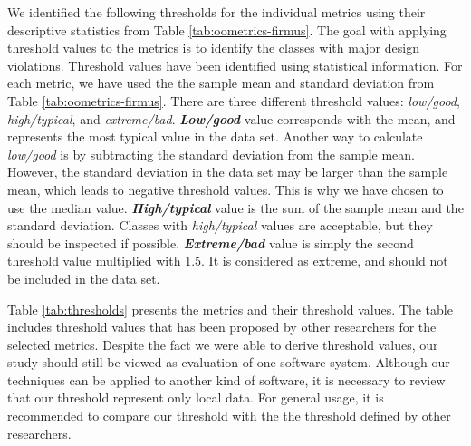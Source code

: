 We identified the following thresholds for the individual metrics using their descriptive statistics from Table \ref{tab:oometrics-firmus}. The goal with applying threshold values to the metrics is to identify the classes with major design violations. Threshold values have been identified using statistical information\cite{lanza2007object}. For each metric, we have used the the sample mean and standard deviation from Table \ref{tab:oometrics-firmus}. There are three different threshold values: \textit{low/good}, \textit{high/typical}, and \textit{extreme/bad}. \textbf{\textit{Low/good}} value corresponds with the mean, and represents the most typical value in the data set\cite{cais2014identifying}. Another way to calculate \textit{low/good} is by subtracting the standard deviation from the sample mean\cite{lanza2007object}. However, the standard deviation in the data set may be larger than the sample mean, which leads to negative threshold values. This is why we have chosen to use the median value. \textbf{\textit{High/typical}} value is the sum of the sample mean and the standard deviation. Classes with \textit{high/typical} values are acceptable, but they should be inspected if possible. \textbf{\textit{Extreme/bad}} value is simply the second threshold value multiplied with 1.5\cite{lanza2007object}. It is considered as extreme, and should not be included in the data set. 


Table \ref{tab:thresholds} presents the metrics and their threshold values. The table includes threshold values that has been proposed by other researchers for the selected metrics. Despite the fact we were able to derive threshold values, our study should still be viewed as evaluation of one software system. Although our techniques can be applied to another kind of software, it is necessary to review that our threshold represent only local data. For general usage, it is recommended to compare our threshold with the the threshold defined by other researchers.

